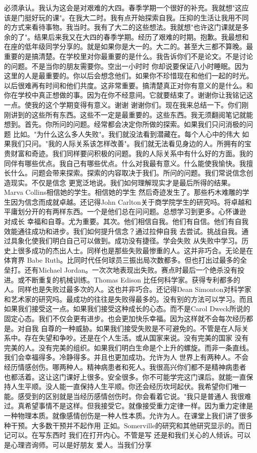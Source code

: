 必须承认。我认为这会是对艰难的大四。春季学期一个很好的补充。我就想"这应该是门挺好玩的课"。在我大二时。我有点开始探索自我。压抑的生活让我用不同的方式来看待事物。我当时。我有了大二的这些想法。我就想"也许这门课就是多余的了"。结果后来我又在大四的春季学期。经历了艰难的时期。抱歉。我最想和在座的低年级同学分享的。就是如果你是大一的。大二的。甚至大三都不算晚。最重要的是搞清楚。在学校里对你最重要的是什么。我告诉你们不是论文。不是讨论的问题。不是当你的朋友需要你。空出一小时时 你却说要保证八小时睡眠。因为这里的人是最重要的。你以后会想念他们。如果你不珍惜现在和他们一起的时光。以后很难再有时间和他们共度。这非常重要。搞清楚真正对你有意义的是什么。和你在学校中真正想做的事。因为在你不经意间。它就要结束了。谢谢你让我铭记这一点。使我的这个学期变得有意义。谢谢 谢谢你们。现在我来总结一下。你们刚刚讲到的这些所有东西。这些不一定是最重要的。这些东西。我无须翻阅笔记就能想到。首先。你所问的问题。经常都会决定你所做的探索。如果我们只问消极的问题 比如。"为什么这么多人失败"。我们就没法看到潜藏在。每个人心中的伟大 如果我们只问。"我的人际关系该怎样改善"。我们就无法看见身边的人。所拥有的宝贵财富和奇迹。我们同样要问积极的问题。我的人际关系中有什么好的方面。我的同伴有哪些优点。我自己有哪些优点。什么对我最有意义。什么能使我愉快。我擅长什么。问题会带来探索。探索的内容取决于我们。所问的问题。我们常说信念创造现实。不仅是信念 更宽泛地说。我们如何理解现实才是最后所得的结果。Marva Collins相信她的学生。相信她的学生 然后奇迹发生了。那些朽木难雕的学生因为信念而成就卓越。还记得John Carlton关于商学院学生的研究吗。将卓越和平庸划分开的有两样东西。一个是他们总在问问题。总想学习到更多。心怀谦逊 对成长 幸福和自尊。尤为重要。其次。他们相信自我。他们有自信。他们有自我效能通往成功和进步。我们如何提升信念？通过拉伸自我 去尝试。挑战自我。通过具象化使我们明白自己可以做到。成功没有捷径。学会失败 从失败中学习。历史上很多成功的杰出人士。同样也是那些失败最惨重的人。这并非巧合。无论是在体育界 Babe Ruth。比同时代任何球员三振出局次数都多。但也打出过最多的全垒打。还有Michael Jordan。一次次地表现出失败。赛点时最后一个绝杀没有投进。或不断重复的机械训练。Thomas Edison 比任何科学家。获得专利都多的人。同样也是失败过最多次的人。这也并非巧合。还记得Dean Simonton对科学家和艺术家的研究吗。最成功的往往是失败得最多的。没有别的方法可以学习。而且如果我们接受这一点。如果我们接受这种成长的心态。而不是Carol Dweck所说的固定心态。我们不仅会更有进步。也会更加快乐幸福。因为这样就不会每次经历都是。对自我 自尊的一种威胁。如果我们接受失败是不可避免的。不管是在人际关系中。存在失望和争吵。还是在个人生活。或从国家来说。没有完美的国家 没有完美的人。没有完美的组织。如果我们明白生命是个上升的螺旋。而非一条直线。我们会幸福得多。冷静得多。并且也更加成功。允许为人 世界上有两种人。不会经历情感创伤。哪两种人。精神病患者和死人。我很高兴你们都不是精神病患者 也都活着。这让这门课好上很多。安全很多。你不可能学完这门课后。就能一直保持人生平顺。没人能一直保持人生平顺。你还会经历坎坷起伏。我希望你们唯一能。感受到的区别就是当经历感情创伤时。你会看着它说。"我只是普通人 我很难过。真希望事情不是这样。但我接受它。就像接受重力定律一样。因为重力定律是一种物理本质。就像感情创伤是一种人性本质。允许为人。在课堂上我们讲了很多种干预。大多数干预并不起作用 正如。Somerville的研究和其他研究显示的。而日记可以。在写东西时 我们在打开内心。不管是写 还是和我们关心的人倾诉。可以是心理咨询师。可以是好朋友 爱人。当我们分享 